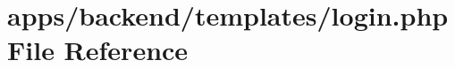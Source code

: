 \hypertarget{login_8php}{\section{apps/backend/templates/login.php File Reference}
\label{login_8php}
}
